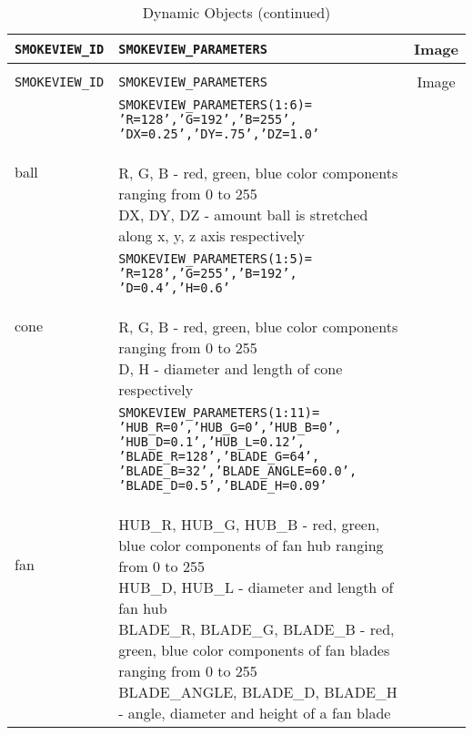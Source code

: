 \begin{longtable}[ht]{|l|l|c|}
\caption{Dynamic Objects}
\label{tab:devices_dynamic}
\\ \hline
{\tt SMOKEVIEW\_ID}  & {\tt SMOKEVIEW\_PARAMETERS} & Image  \\ \hline \hline
\endfirsthead
\caption{Dynamic Objects (continued)}
\\ \hline
{\tt SMOKEVIEW\_ID}  & {\tt SMOKEVIEW\_PARAMETERS} & Image  \\ \hline \hline
\endhead

ball&
\parbox[c]{\boxwidth}{
{\tt SMOKEVIEW\_PARAMETERS(1:6)=}\\
{\tt 'R=128','G=192','B=255',}\\
{\tt 'DX=0.25','DY=.75','DZ=1.0'}\\  \\
R, G, B - red, green, blue color components ranging from 0 to 255\\
DX, DY, DZ - amount ball is stretched along x, y, z axis respectively
} &
 \\ \hline

cone&
\parbox[c]{\boxwidth}{
{\tt SMOKEVIEW\_PARAMETERS(1:5)=}\\
{\tt 'R=128','G=255','B=192',}\\
{\tt 'D=0.4','H=0.6'}\\ \\
R, G, B - red, green, blue color components ranging from 0 to 255\\
D, H - diameter and length of cone respectively
} &
 \\ \hline

fan&
\parbox[c]{\boxwidth}{
{\tt SMOKEVIEW\_PARAMETERS(1:11)=}\\
{\tt 'HUB\_R=0','HUB\_G=0','HUB\_B=0',}\\
{\tt 'HUB\_D=0.1','HUB\_L=0.12',}\\
{\tt 'BLADE\_R=128','BLADE\_G=64',}\\
{\tt 'BLADE\_B=32','BLADE\_ANGLE=60.0',}\\
{\tt 'BLADE\_D=0.5','BLADE\_H=0.09'}\\  \\
HUB\_R, HUB\_G, HUB\_B - red, green, blue color components of fan hub ranging from 0 to 255\\
HUB\_D, HUB\_L - diameter and length of fan hub\\
BLADE\_R, BLADE\_G, BLADE\_B - red, green, blue color components of fan blades ranging from 0 to 255\\
BLADE\_ANGLE, BLADE\_D, BLADE\_H - angle, diameter and height of a fan blade
} &
 \\ \hline


\end{longtable}
